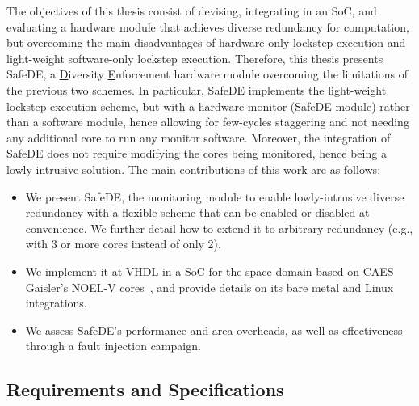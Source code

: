 The objectives of this thesis consist of devising, integrating in an SoC, and evaluating a hardware module that achieves diverse redundancy for computation, but overcoming the main disadvantages of hardware-only lockstep execution and light-weight software-only lockstep execution. 
Therefore, this thesis presents SafeDE, a \underline{D}iversity \underline{E}nforcement hardware module overcoming the limitations of the previous two schemes. In particular, SafeDE implements the light-weight lockstep execution scheme, but with a hardware monitor (SafeDE module) rather than a software module, hence allowing for few-cycles staggering and not needing any additional core to run any monitor software. Moreover, the integration of SafeDE does not require modifying the cores being monitored, hence being a lowly intrusive solution.
The main contributions of this work are as follows:
\begin{itemize}
\item We present SafeDE, the monitoring module to enable lowly-intrusive diverse redundancy with a flexible scheme that can be enabled or disabled at convenience. We further detail how to extend it to arbitrary redundancy (e.g., with 3 or more cores instead of only 2).
\item We implement it at VHDL in a SoC for the space domain based on CAES Gaisler's NOEL-V cores~\cite{gomez2020risc,SELENEgit}, and provide details on its bare metal and Linux integrations.
\item We assess SafeDE's performance and area overheads, as well as effectiveness through a fault injection campaign.
\end{itemize}



\subsection{Requirements and Specifications}

